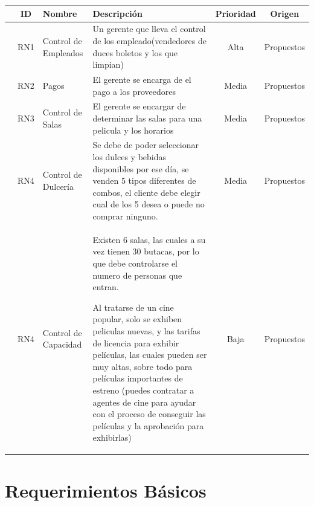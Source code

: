 \documentclass[11pt, fleqn]{article}                             %
\begin{document}
    \begin{tabular}{r ||c |m{7em} | m{15em} |c |c }
       &  ID & Nombre & Descripción & Prioridad & Origen \\ [0.5ex] 
       \hline\hline
      
        & RN1   & Control de Empleados                  &
        Un gerente que lleva el control de los empleado(vendedores de duces boletos y los que limpian)
        & Alta  & Propuestos\\

        & RN2   & Pagos                                 &
        El gerente se encarga de el pago a los proveedores
        & Media  & Propuestos\\

        & RN3   & Control de Salas                      &
        El gerente se encargar de determinar las salas para una pelicula y los horarios
        & Media  & Propuestos\\


        & RN4   & Control de Dulcería                   &
        Se debe de poder seleccionar los dulces y bebidas disponibles por ese día, 
        se venden 5 tipos diferentes de combos, el cliente debe elegir cual de los
        5 desea o puede no comprar ninguno.
        & Media  & Propuestos\\

        & RN4   & Control de Capacidad                   &
        Existen 6 salas, las cuales a su vez tienen 30 butacas, por lo que debe controlarse el numero
        de personas que entran.

        Al tratarse de un cine popular, solo se exhiben peliculas nuevas, y las tarifas de licencia
        para exhibir películas, las cuales pueden ser muy altas, sobre todo para películas importantes
        de estreno (puedes contratar a agentes de cine para ayudar con el proceso de conseguir las
        películas y la aprobación para exhibirlas)
        & Baja  & Propuestos\\

    \end{tabular}


\clearpage
\section{Requerimientos Básicos}
\end{document}
